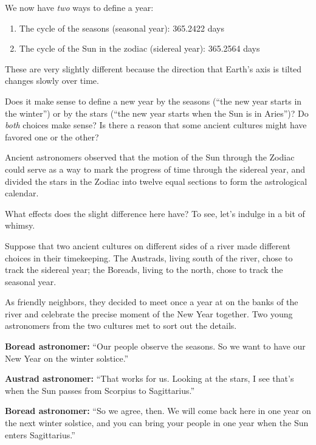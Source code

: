 \documentclass[11pt]{article}
\begin{document}
\vspace{1.8in}
\underline{\hspace{6in}}

We now have {\it two} ways to define a year: 

\begin{enumerate}
	\item The cycle of the seasons (seasonal year): 365.2422 days
	\item The cycle of the Sun in the zodiac (sidereal year): 365.2564 days
\end{enumerate}

These are very slightly different because the direction that Earth's axis is tilted changes slowly over time. 

Does it make sense to define a new year by the seasons (``the new year starts in the winter'') or by the stars (``the new year starts when the Sun is in Aries'')? Do {\it both} choices make sense? Is there a reason that some ancient cultures might have favored one or the other?


\vspace{1.8in}
\underline{\hspace{6in}}

Ancient astronomers observed that the motion of the Sun through the Zodiac could serve as a way to mark the progress of time through the sidereal year, and divided the stars in the Zodiac into twelve equal sections to form the astrological calendar. 

What effects does the slight difference here have? To see, let's indulge in a bit of whimsy.

Suppose that two ancient cultures on different sides of a river made different choices in their timekeeping. The Austrads, living south of the river, chose to track the sidereal year; the Boreads, living to the north, chose to track the seasonal year. 

As friendly neighbors, they decided to meet once a year at on the banks of the river and celebrate the precise moment of the New Year together. Two young astronomers from the two cultures met to sort out the details. 

\vspace{1em}

\hspace{0.05\textwidth}
\begin{minipage}{0.9\textwidth}
{\bf Boread astronomer:} ``Our people observe the seasons. So we want to have our New Year on the winter solstice.''

\medskip

{\bf Austrad astronomer:} ``That works for us. Looking at the stars, I see that's when the Sun passes from Scorpius to Sagittarius.''

\medskip

{\bf Boread astronomer:} ``So we agree, then. We will come back here in one year on the next winter solstice, and you can bring your people in one year when the Sun enters Sagittarius.''
\end{minipage}
\end{document}
